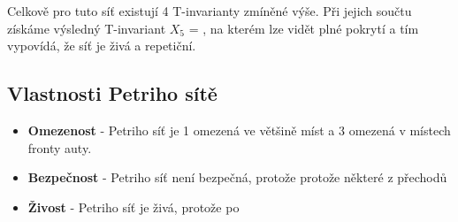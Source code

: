 Celkově pro tuto síť existují 4 T-invarianty zmíněné výše.
Při jejich součtu získáme výsledný T-invariant $X_5$ = \orderArray{\xAll}, na kterém lze vidět plné pokrytí a tím vypovídá, že síť je živá a repetiční.

\subsection*{Vlastnosti Petriho sítě}
\label{subsec:network_properties}

\begin{itemize}
    \item \textbf{Omezenost} - Petriho síť je 1 omezená ve většině míst a 3 omezená v místech fronty auty.
    \item \textbf{Bezpečnost} - Petriho síť není bezpečná, protože protože některé z přechodů
    \item \textbf{Živost} - Petriho síť je živá, protože po
\end{itemize}

\endinput